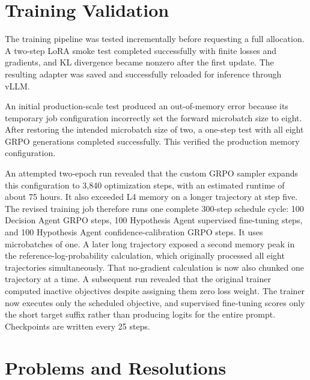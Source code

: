 \documentclass[11pt]{article}
\begin{document}
\section{Training Validation}

The training pipeline was tested incrementally before requesting a full
allocation. A two-step LoRA smoke test completed successfully with finite
losses and gradients, and KL divergence became nonzero after the first update.
The resulting adapter was saved and successfully reloaded for inference through
vLLM.

An initial production-scale test produced an out-of-memory error because its
temporary job configuration incorrectly set the forward microbatch size to
eight. After restoring the intended microbatch size of two, a one-step test
with all eight GRPO generations completed successfully. This verified the
production memory configuration.

An attempted two-epoch run revealed that the custom GRPO sampler expands this
configuration to 3,840 optimization steps, with an estimated runtime of about
75 hours. It also exceeded L4 memory on a longer trajectory at step five. The
revised training job therefore runs one complete 300-step schedule cycle: 100
Decision Agent GRPO steps, 100 Hypothesis Agent supervised fine-tuning steps,
and 100 Hypothesis Agent confidence-calibration GRPO steps. It uses
microbatches of one. A later long trajectory exposed a second memory peak in
the reference-log-probability calculation, which originally processed all
eight trajectories simultaneously. That no-gradient calculation is now also
chunked one trajectory at a time. A subsequent run revealed that the original
trainer computed inactive objectives despite assigning them zero loss weight.
The trainer now executes only the scheduled objective, and supervised
fine-tuning scores only the short target suffix rather than producing logits
for the entire prompt. Checkpoints are written every 25 steps.

\section{Problems and Resolutions}
\end{document}
